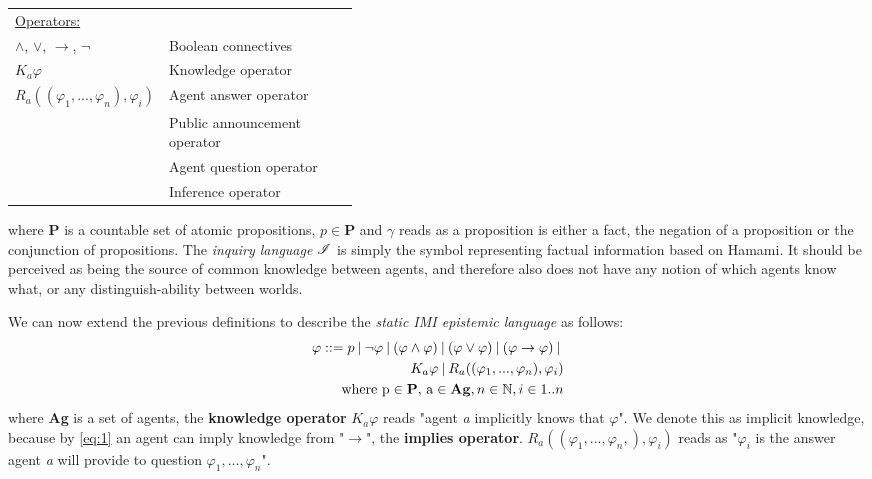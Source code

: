\begin{table}[t]
\begin{tabularx}{\linewidth}{p{0.40\linewidth}X}
		\multicolumn{2}{l}{{\underline{Operators:}}}                                                           \\
		$\land$, $\lor$, $\rightarrow$, $\neg$    & Boolean connectives                                      \\
		$K_a\varphi$                                & Knowledge operator                                       \\
		$R_a((\varphi_1,...,\varphi_n), \varphi_i)$ & Agent answer operator                                    \\
		\pubop                                      & Public announcement operator                             \\
		\agquestop                                  & Agent question operator                                  \\
		\infop                                      & Inference operator                                       \\
		
		\bottomrule
	\end{tabularx}
\end{table}
where \textbf{P} is a countable set of atomic propositions, $p \in\mathbf{P}$
and $\gamma$ reads as a proposition is either a fact, the negation of a
proposition or the conjunction of propositions. The \textit{inquiry language}
$\mathscr{I}$ is simply the symbol representing factual information based on
Hamami\cite{delimi}. It should be perceived as being the source of common
knowledge between agents, and therefore also does not have any notion of which
agents know what, or any distinguish-ability between worlds.

We can now extend the previous definitions to describe the \textit{static IMI
    epistemic language} \staticlang\: as follows:
\begin{align}
    \begin{split}
        \varphi ::= p \:|\:\neg\varphi\:|\:(\varphi \land \varphi) \:|\: (\varphi \lor \varphi) \:|\: (\varphi \rightarrow \varphi) \:|\: \\K_a\varphi \:|\: R_a((\varphi_1,...,\varphi_n), \varphi_i) \\ \text{where p} \in \text{\textbf{P}}\text{, a} \in \text{\textbf{Ag}}, n \in \mathbb{N}, i \in 1..n \label{eq:2}
    \end{split}
\end{align}
where \textbf{Ag} is a set of agents, the \textbf{knowledge operator} $K_a\varphi$ reads "agent \textit{a} implicitly knows that $\varphi$". We denote this as implicit knowledge, because by \cref{eq:1} an agent can imply knowledge from "$\rightarrow$", the \textbf{implies operator}. $R_a((\varphi_1,...,\varphi_n,), \varphi_i)$ reads as "$\varphi_i$ is the answer agent \textit{a} will provide to question $\varphi_1,...,\varphi_n$". \\

